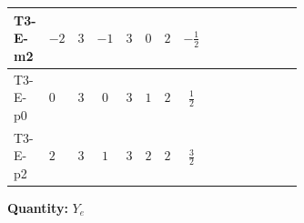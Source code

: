 \documentclass[8pt]{article}
\begin{document}
\begin{landscape}
\begin{longtable}{@{}llcccccc >{\raggedright\arraybackslash}p{0.21\linewidth} >{\raggedright\arraybackslash}p{0.21\linewidth} >{\raggedright\arraybackslash}p{0.21\linewidth}@{}}
\midrule
T3-E-m2 & $-2$ & $3$ & $-1$ & $3$ & $0$ & $2$ & $-\frac{1}{2}$ & \scriptsize\adjustbox{max width=\linewidth}{$\begin{gathered} 3 \operatorname{Tr}\!\left({Y_d}\,\left({Y_d}\right)^{\dagger}\right) \left({Y_e}\right)_{ij}\end{gathered}$} & \scriptsize\adjustbox{max width=\linewidth}{$\begin{gathered} +3 \operatorname{Tr}\!\left({Y_u}\,\left({Y_u}\right)^{\dagger}\right) \left({Y_e}\right)_{ij}\end{gathered}$} & \scriptsize\adjustbox{max width=\linewidth}{$\begin{gathered} +\operatorname{Tr}\!\left({Y_e}\,\left({Y_e}\right)^{\dagger}\right) \left({Y_e}\right)_{ij}\end{gathered}$} \\
\midrule
T3-E-p0 & $0$ & $3$ & $0$ & $3$ & $1$ & $2$ & $\frac{1}{2}$ & \scriptsize\adjustbox{max width=\linewidth}{$\begin{gathered} 3 \operatorname{Tr}\!\left({Y_d}\,\left({Y_d}\right)^{\dagger}\right) \left({Y_e}\right)_{ij}\end{gathered}$} & \scriptsize\adjustbox{max width=\linewidth}{$\begin{gathered} +3 \operatorname{Tr}\!\left({Y_u}\,\left({Y_u}\right)^{\dagger}\right) \left({Y_e}\right)_{ij}\end{gathered}$} & \scriptsize\adjustbox{max width=\linewidth}{$\begin{gathered} +\operatorname{Tr}\!\left({Y_e}\,\left({Y_e}\right)^{\dagger}\right) \left({Y_e}\right)_{ij}\end{gathered}$} \\
\midrule
T3-E-p2 & $2$ & $3$ & $1$ & $3$ & $2$ & $2$ & $\frac{3}{2}$ & \scriptsize\adjustbox{max width=\linewidth}{$\begin{gathered} 3 \operatorname{Tr}\!\left({Y_d}\,\left({Y_d}\right)^{\dagger}\right) \left({Y_e}\right)_{ij}\end{gathered}$} & \scriptsize\adjustbox{max width=\linewidth}{$\begin{gathered} +3 \operatorname{Tr}\!\left({Y_u}\,\left({Y_u}\right)^{\dagger}\right) \left({Y_e}\right)_{ij}\end{gathered}$} & \scriptsize\adjustbox{max width=\linewidth}{$\begin{gathered} +\operatorname{Tr}\!\left({Y_e}\,\left({Y_e}\right)^{\dagger}\right) \left({Y_e}\right)_{ij}\end{gathered}$} \\
\midrule
\bottomrule
\end{longtable}
\clearpage
\noindent\textbf{Quantity: }$Y_e$\par\smallskip

\end{landscape}
\end{document}
